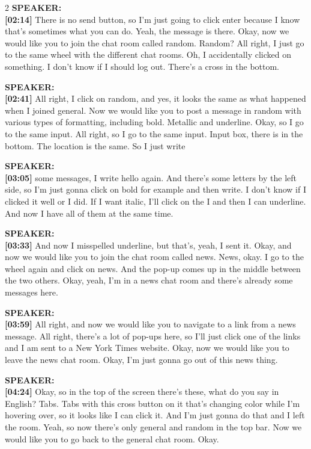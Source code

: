 {\begin{multicols}{2}
\vspace{0.3cm}
\textbf{SPEAKER:}\\
\textbf{[02:14]} There is no send button, so I'm just going to click enter because I know that's sometimes what you can do. Yeah, the message is there. Okay, now we would like you to join the chat room called random. Random? All right, I just go to the same wheel with the different chat rooms. Oh, I accidentally clicked on something. I don't know if I should log out. There's a cross in the bottom.

\vspace{0.3cm}
\textbf{SPEAKER:}\\
\textbf{[02:41]} All right, I click on random, and yes, it looks the same as what happened when I joined general. Now we would like you to post a message in random with various types of formatting, including bold. Metallic and underline. Okay, so I go to the same input. All right, so I go to the same input. Input box, there is in the bottom. The location is the same. So I just write

\vspace{0.3cm}
\textbf{SPEAKER:}\\
\textbf{[03:05]} some messages, I write hello again. And there's some letters by the left side, so I'm just gonna click on bold for example and then write. I don't know if I clicked it well or I did. If I want italic, I'll click on the I and then I can underline. And now I have all of them at the same time.

\vspace{0.3cm}
\textbf{SPEAKER:}\\
\textbf{[03:33]} And now I misspelled underline, but that's, yeah, I sent it. Okay, and now we would like you to join the chat room called news. News, okay. I go to the wheel again and click on news. And the pop-up comes up in the middle between the two others. Okay, yeah, I'm in a news chat room and there's already some messages here.

\vspace{0.3cm}
\textbf{SPEAKER:}\\
\textbf{[03:59]} All right, and now we would like you to navigate to a link from a news message. All right, there's a lot of pop-ups here, so I'll just click one of the links and I am sent to a New York Times website. Okay, now we would like you to leave the news chat room. Okay, I'm just gonna go out of this news thing.

\vspace{0.3cm}
\textbf{SPEAKER:}\\
\textbf{[04:24]} Okay, so in the top of the screen there's these, what do you say in English? Tabs. Tabs with this cross button on it that's changing color while I'm hovering over, so it looks like I can click it. And I'm just gonna do that and I left the room. Yeah, so now there's only general and random in the top bar. Now we would like you to go back to the general chat room. Okay.


\end{multicols}}
